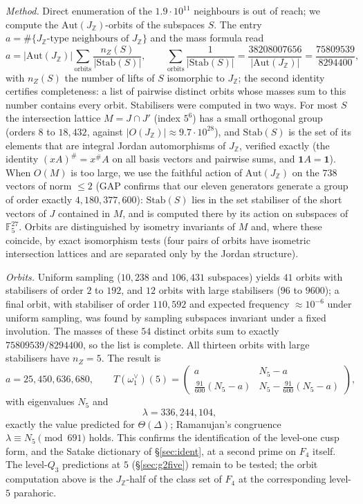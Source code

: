 \documentclass[11pt]{amsart}
\theoremstyle{definition}
\newcommand{\Z}{\mathbb{Z}}\newcommand{\Q}{\mathbb{Q}}\newcommand{\R}{\mathbb{R}}\newcommand{\A}{\mathbb{A}}\newcommand{\F}{\mathbb{F}}
\begin{document}
\emph{Method.} Direct enumeration of the $1.9\cdot10^{11}$ neighbours is out of reach; we compute the $\mathrm{Aut}(J_\Z)$-orbits of the subspaces $S$. The entry $a=\#\{J_\Z\text{-type neighbours of }J_\Z\}$ and the mass formula read
\[a=|\mathrm{Aut}(J_\Z)|\sum_{\mathrm{orbits}}\frac{n_Z(S)}{|\mathrm{Stab}(S)|},\qquad \sum_{\mathrm{orbits}}\frac1{|\mathrm{Stab}(S)|}=\frac{38208007656}{|\mathrm{Aut}(J_\Z)|}=\frac{75809539}{8294400},\]
with $n_Z(S)$ the number of lifts of $S$ isomorphic to $J_\Z$; the second identity certifies completeness: a list of pairwise distinct orbits whose masses sum to this number contains every orbit. Stabilisers were computed in two ways. For most $S$ the intersection lattice $M=J\cap J'$ (index $5^6$) has a small orthogonal group (orders $8$ to $18{,}432$, against $|O(J_\Z)|\approx9.7\cdot10^{28}$), and $\mathrm{Stab}(S)$ is the set of its elements that are integral Jordan automorphisms of $J_\Z$, verified exactly (the identity $(xA)^\#=x^\#A$ on all basis vectors and pairwise sums, and $\mathbf 1A=\mathbf 1$). When $O(M)$ is too large, we use the faithful action of $\mathrm{Aut}(J_\Z)$ on the $738$ vectors of norm $\le2$ (GAP confirms that our eleven generators generate a group of order exactly $4{,}180{,}377{,}600$): $\mathrm{Stab}(S)$ lies in the set stabiliser of the short vectors of $J$ contained in $M$, and is computed there by its action on subspaces of $\F_5^{27}$. Orbits are distinguished by isometry invariants of $M$ and, where these coincide, by exact isomorphism tests (four pairs of orbits have isometric intersection lattices and are separated only by the Jordan structure).

\emph{Orbits.} Uniform sampling ($10{,}238$ and $106{,}431$ subspaces) yields $41$ orbits with stabilisers of order $2$ to $192$, and $12$ orbits with large stabilisers ($96$ to $9600$); a final orbit, with stabiliser of order $110{,}592$ and expected frequency $\approx10^{-6}$ under uniform sampling, was found by sampling subspaces invariant under a fixed involution. The masses of these $54$ distinct orbits sum to exactly $75809539/8294400$, so the list is complete. All thirteen orbits with large stabilisers have $n_Z=5$. The result is
\[a=25{,}450{,}636{,}680,\qquad T(\omega_1^\vee)(5)=\begin{pmatrix}a&N_5-a\\[2pt] \tfrac{91}{600}(N_5-a)&N_5-\tfrac{91}{600}(N_5-a)\end{pmatrix},\]
with eigenvalues $N_5$ and
\[\lambda=336{,}244{,}104,\]
exactly the value predicted for $\Theta(\Delta)$; Ramanujan's congruence $\lambda\equiv N_5\pmod{691}$ holds. This confirms the identification of the level-one cusp form, and the Satake dictionary of \S\ref{sec:ident}, at a second prime on $F_4$ itself. The level-$Q_3$ predictions at $5$ (\S\ref{sec:g2five}) remain to be tested; the orbit computation above is the $J_\Z$-half of the class set of $F_4$ at the corresponding level-$5$ parahoric.
\end{document}

